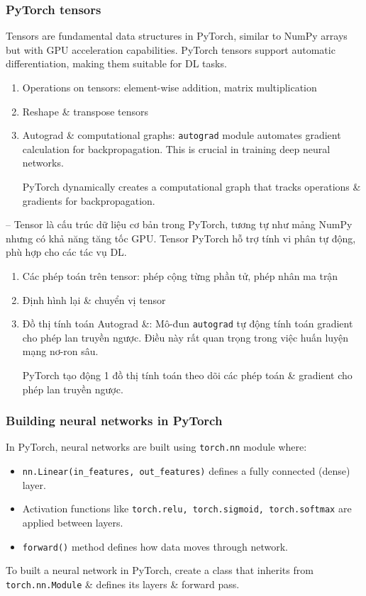 \documentclass{article}
\begin{document}

\subsubsection{PyTorch tensors}
Tensors are fundamental data structures in PyTorch, similar to NumPy arrays but with GPU acceleration capabilities. PyTorch tensors support automatic differentiation, making them suitable for DL tasks.
\begin{enumerate}
    \item Operations on tensors: element-wise addition, matrix multiplication
    \item Reshape \& transpose tensors
    \item Autograd \& computational graphs: {\tt autograd} module automates gradient calculation for backpropagation. This is crucial in training deep neural networks.

    PyTorch dynamically creates a computational graph that tracks operations \& gradients for backpropagation.
\end{enumerate}
-- Tensor là cấu trúc dữ liệu cơ bản trong PyTorch, tương tự như mảng NumPy nhưng có khả năng tăng tốc GPU. Tensor PyTorch hỗ trợ tính vi phân tự động, phù hợp cho các tác vụ DL.
\begin{enumerate}
    \item Các phép toán trên tensor: phép cộng từng phần tử, phép nhân ma trận
    \item Định hình lại \& chuyển vị tensor
    \item Đồ thị tính toán Autograd \&: Mô-đun {\tt autograd} tự động tính toán gradient cho phép lan truyền ngược. Điều này rất quan trọng trong việc huấn luyện mạng nơ-ron sâu.

    PyTorch tạo động 1 đồ thị tính toán theo dõi các phép toán \& gradient cho phép lan truyền ngược.
\end{enumerate}


\subsubsection{Building neural networks in PyTorch}
In PyTorch, neural networks are built using {\tt torch.nn} module where:
\begin{itemize}
    \item \verb|nn.Linear(in_features, out_features)| defines a fully connected (dense) layer.
    \item Activation functions like {\tt torch.relu, torch.sigmoid, torch.softmax} are applied between layers.
    \item {\tt forward()} method defines how data moves through network.
\end{itemize}
To built a neural network in PyTorch, create a class that inherits from {\tt torch.nn.Module} \& defines its layers \& forward pass.
\end{document}
